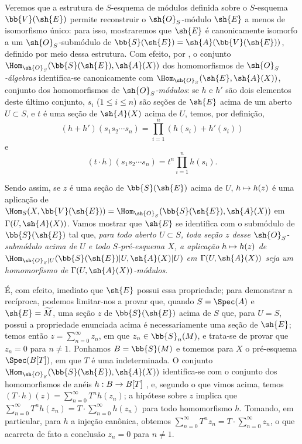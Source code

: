 \documentclass[oneside,10pt]{amsart}
\makeatletter
\renewcommand{\leq}{\leqslant}
\newcommand{\ega@arrow}[2]{\mathchoice{#1}{#2}{#2}{#2}}
\let\ega@shortmapsto\mapsto
\renewcommand{\to}{\ega@arrow{\longrightarrow}{\rightarrow}}
\renewcommand{\mapsto}{\ega@arrow{\longmapsto}{\ega@shortmapsto}}
\newcommand{\oldpage}[2][]{\marginnote{\normalfont\footnotesize\textbf{#1}~|~#2}\ignorespaces}
\let\EGAOriginalLabel\label
\renewcommand{\label}[1]{\phantomsection\EGAOriginalLabel{#1}}
\makeatother
\begin{document}
\begin{env}[1.7.14]
\label{II.1.7.14}
Veremos que a estrutura de $S$-esquema de módulos definida sobre o $S$-esquema $\bb{V}(\sh{E})$ permite reconstruir o $\sh{O}_S$-módulo $\sh{E}$ a menos de isomorfismo único: para isso, mostraremos que $\sh{E}$ é canonicamente isomorfo a um $\sh{O}_S$-submódulo de $\bb{S}(\sh{E})=\sh{A}(\bb{V}(\sh{E}))$, definido por meio dessa estrutura.
Com efeito, por , o conjunto $\Hom_{\sh{O}_S}(\bb{S}(\sh{E}),\sh{A}(X))$ dos homomorfismos de \emph{$\sh{O}_S$-álgebras} identifica-se canonicamente com $\Hom_{\sh{O}_S}(\sh{E},\sh{A}(X))$, conjunto dos homomorfismos de \emph{$\sh{O}_S$-módulos}: se $h$ e $h'$ são dois elementos deste último conjunto, $s_i$ ($1\leq i\leq n$) são seções de $\sh{E}$ acima de um aberto $U\subset S$, e $t$ é uma seção de $\sh{A}(X)$ acima de $U$, temos, por definição,
\[
  (h+h')(s_1s_2\cdots s_n)=\prod_{i=1}^n(h(s_i)+h'(s_i))
\]
e
\[
  (t\cdot h)(s_1s_2\cdots s_n)=t^n\prod_{i=1}^n h(s_i).
\]

Sendo assim, se $z$ é uma seção de $\bb{S}(\sh{E})$ acima de $U$, $h\mapsto h(z)$ é uma aplicação de $\Hom_S(X,\bb{V}(\sh{E}))=\Hom_{\sh{O}_S}(\bb{S}(\sh{E}),\sh{A}(X))$ em $\Gamma(U,\sh{A}(X))$.
Vamos
\oldpage[II]{19}
mostrar que $\sh{E}$ se identifica com o submódulo de $\bb{S}(\sh{E})$ tal que, \emph{para todo aberto $U\subset S$, toda seção $z$ desse $\sh{O}_S$-submódulo acima de $U$ e todo $S$-pré-esquema $X$, a aplicação $h\mapsto h(z)$ de $\Hom_{\sh{O}_S|U}(\bb{S}(\sh{E})|U,\sh{A}(X)|U)$ em $\Gamma(U,\sh{A}(X))$ seja um homomorfismo de $\Gamma(U,\sh{A}(X))$-módulos}.

É, com efeito, imediato que $\sh{E}$ possui essa propriedade; para demonstrar a recíproca, podemos limitar-nos a provar que, quando $S=\Spec(A)$ e $\sh{E}=\widetilde{M}$, uma seção $z$ de $\bb{S}(\sh{E})$ acima de $S$ que, para $U=S$, possui a propriedade enunciada acima é necessariamente uma seção de $\sh{E}$; temos então $z=\sum_{n=0}^{\infty}z_n$, em que $z_n\in\bb{S}_n(M)$, e trata-se de provar que $z_n=0$ para $n\neq1$.
Ponhamos $B=\bb{S}(M)$ e tomemos para $X$ o pré-esquema $\Spec(B[T])$, em que $T$ é uma indeterminada.
O conjunto $\Hom_{\sh{O}_S}(\bb{S}(\sh{E}),\sh{A}(X))$ identifica-se com o conjunto dos homomorfismos de anéis $h:B\to B[T]$ , e, segundo o que vimos acima, temos $(T\cdot h)(z)=\sum_{n=0}^{\infty}T^n h(z_n)$; a hipótese sobre $z$ implica que $\sum_{n=0}^{\infty}T^n h(z_n)=T\cdot\sum_{n=0}^{\infty}h(z_n)$ para todo homomorfismo $h$.
Tomando, em particular, para $h$ a injeção canônica, obtemos $\sum_{n=0}^{\infty}T^n z_n=T\cdot\sum_{n=0}^{\infty}z_n$, o que acarreta de fato a conclusão $z_n=0$ para $n\neq1$.
\end{env}
\end{document}
